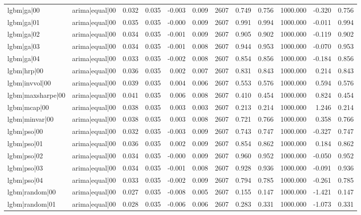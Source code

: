 \begin{table}
\begin{tabular}{llrrrrrrrrrr}
lgbm|ga|00 & arima|equal|00 & 0.032 & 0.035 & -0.003 & 0.009 & 2607 & 0.749 & 0.756 & 1000.000 & -0.320 & 0.756 \\
lgbm|ga|01 & arima|equal|00 & 0.035 & 0.035 & -0.000 & 0.009 & 2607 & 0.991 & 0.994 & 1000.000 & -0.011 & 0.994 \\
lgbm|ga|02 & arima|equal|00 & 0.034 & 0.035 & -0.001 & 0.009 & 2607 & 0.905 & 0.902 & 1000.000 & -0.119 & 0.902 \\
lgbm|ga|03 & arima|equal|00 & 0.034 & 0.035 & -0.001 & 0.008 & 2607 & 0.944 & 0.953 & 1000.000 & -0.070 & 0.953 \\
lgbm|ga|04 & arima|equal|00 & 0.033 & 0.035 & -0.002 & 0.008 & 2607 & 0.854 & 0.856 & 1000.000 & -0.184 & 0.856 \\
lgbm|hrp|00 & arima|equal|00 & 0.036 & 0.035 & 0.002 & 0.007 & 2607 & 0.831 & 0.843 & 1000.000 & 0.214 & 0.843 \\
lgbm|invvol|00 & arima|equal|00 & 0.039 & 0.035 & 0.004 & 0.006 & 2607 & 0.553 & 0.576 & 1000.000 & 0.594 & 0.576 \\
lgbm|maxsharpe|00 & arima|equal|00 & 0.041 & 0.035 & 0.006 & 0.008 & 2607 & 0.410 & 0.454 & 1000.000 & 0.824 & 0.454 \\
lgbm|mcap|00 & arima|equal|00 & 0.038 & 0.035 & 0.003 & 0.003 & 2607 & 0.213 & 0.214 & 1000.000 & 1.246 & 0.214 \\
lgbm|minvar|00 & arima|equal|00 & 0.038 & 0.035 & 0.003 & 0.008 & 2607 & 0.721 & 0.766 & 1000.000 & 0.358 & 0.766 \\
lgbm|pso|00 & arima|equal|00 & 0.032 & 0.035 & -0.003 & 0.009 & 2607 & 0.743 & 0.747 & 1000.000 & -0.327 & 0.747 \\
lgbm|pso|01 & arima|equal|00 & 0.036 & 0.035 & 0.002 & 0.009 & 2607 & 0.854 & 0.862 & 1000.000 & 0.184 & 0.862 \\
lgbm|pso|02 & arima|equal|00 & 0.034 & 0.035 & -0.000 & 0.009 & 2607 & 0.960 & 0.952 & 1000.000 & -0.050 & 0.952 \\
lgbm|pso|03 & arima|equal|00 & 0.034 & 0.035 & -0.001 & 0.008 & 2607 & 0.928 & 0.936 & 1000.000 & -0.091 & 0.936 \\
lgbm|pso|04 & arima|equal|00 & 0.033 & 0.035 & -0.002 & 0.009 & 2607 & 0.794 & 0.785 & 1000.000 & -0.261 & 0.785 \\
lgbm|random|00 & arima|equal|00 & 0.027 & 0.035 & -0.008 & 0.005 & 2607 & 0.155 & 0.147 & 1000.000 & -1.421 & 0.147 \\
lgbm|random|01 & arima|equal|00 & 0.028 & 0.035 & -0.006 & 0.006 & 2607 & 0.283 & 0.331 & 1000.000 & -1.073 & 0.331 \\

\end{tabular}
\end{table}
